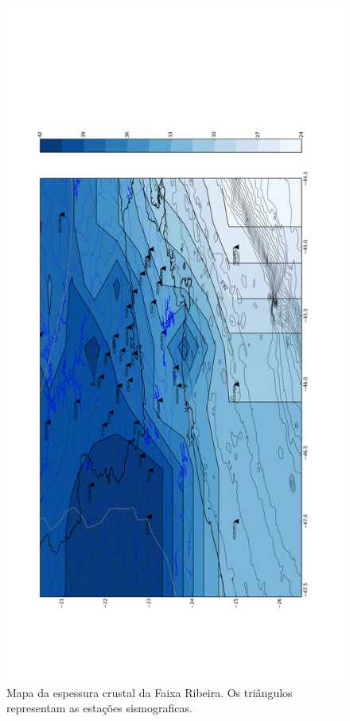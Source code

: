 \begin{figure}[!ht]
\centering
\includegraphics[scale=0.20]{Interpolacao_Linear.png}
\caption{Mapa da espessura crustal da Faixa Ribeira. Os triângulos representam as estações sismograficas.}
\label{Interpolacao}
\end{figure}

